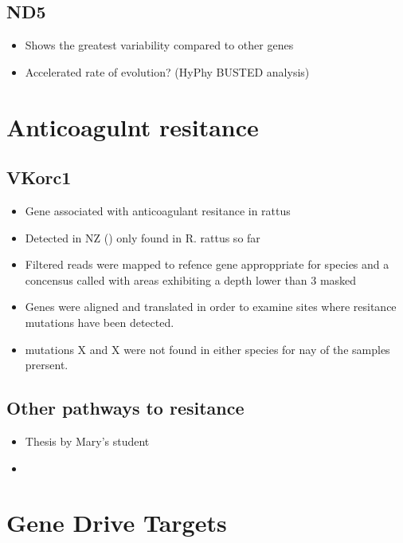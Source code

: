 \documentclass[document.tex]{subfiles}
\begin{document}
    \subsection{ND5}
        \begin{itemize}
        \item Shows the greatest variability compared to other genes 
        \item Accelerated rate of evolution? (HyPhy BUSTED analysis)
    \end{itemize}

\section*{Anticoagulnt resitance}

    \subsection{VKorc1}
        \begin{itemize}
        \item Gene associated with anticoagulant resitance in rattus
        \item Detected in NZ () only found in R. rattus so far
        \item Filtered reads were mapped to refence gene approppriate for species and a concensus called with areas exhibiting a depth lower than 3 masked
        \item Genes were aligned and translated in order to examine sites where resitance mutations have been detected.
        \item mutations X and X were not found in either species for nay of the samples prersent. 
        \end{itemize}

    \subsection{Other pathways to resitance}
        \begin{itemize}
        \item Thesis by Mary's student
        \item 
        \end{itemize}



\section*{Gene Drive Targets}
\end{document}

